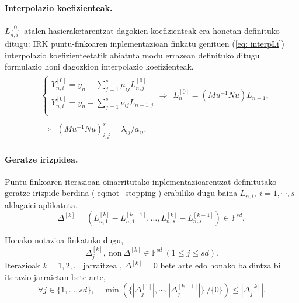\paragraph*{Interpolazio koefizienteak.} $L_{n,i}^{[0]}$ atalen hasieraketarentzat dagokien koefizienteak era honetan definituko ditugu: IRK puntu-finkoaren inplementazioan finkatu genituen (\ref{eq: interpLi}) interpolazio koefizienteetatik abiatuta  modu errazean definituko ditugu formulazio honi dagozkion interpolazio koefizienteak.
\begin{align}
\begin{split}
&\left \{ \begin{array}{c}
  Y_{n,i}^{[0]}=y_n+\sum_{j=1}^{s} \mu_{ij} L_{n,j}^{[0]} \\[.25cm]
  Y_{n,i}^{[0]}=y_n+\sum_{j=1}^{s} \nu_{ij} L_{n-1,j} \\
          \end{array} \right. 
\Rightarrow \ \ L_n^{{[0]}}=(Mu^{-1} Nu) L_{n-1},\\
\\
&\Rightarrow  \ \ (Mu^{-1} Nu)_{i,j}^{s}=\lambda_{ij}/a_{ij}.
\end{split}
\end{align}

\paragraph*{Geratze irizpidea.} Puntu-finkoaren iterazioan oinarritutako inplementazioarentzat definitutako geratze irizpide berdina (\ref{eq:not_stopping}) erabiliko dugu baina $L_{n,i}, \ i=1,\cdots,s$ aldagaiei aplikatuta.
\begin{equation*}
\Delta^{[k]}=(L_{n,1}^{[k]}-L_{n,1}^{[k-1]},\dots,L_{n,s}^{[k]}-L_{n,s}^{[k-1]}) \in \mathbb{F}^{sd},
\end{equation*}

Honako notazioa finkatuko dugu,
\begin{equation*}
\Delta_j^{[k]}, \ \text{non} \ \Delta^{[k]} \in \mathbb{F}^{sd}  \ (1\leqslant j \leqslant sd).
\end{equation*}
 Iterazioak  $k=1,2,\ldots$ jarraitzea , $ \Delta^{[k]} =0$ bete arte edo honako baldintza bi iterazio jarraietan bete arte,
\begin{equation}
\label{eq:not_stoppingLi}
\forall j \in \{1,\ldots,s d\},  \quad
\min \left(\{|\Delta_j^{[1]}|,\cdots ,|\Delta_j^{[k-1]}|\} \ /\{0\} \right) \leqslant |\Delta_j^{[k]}|.
\end{equation}


